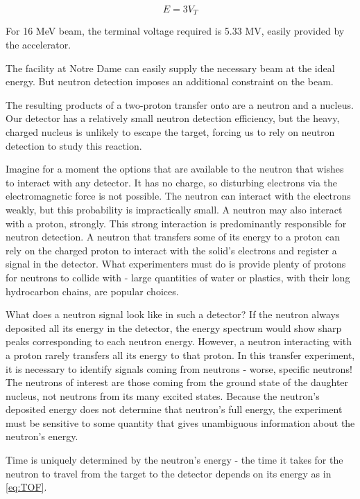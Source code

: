 \begin{equation}
E = 3V_T
\end{equation}

For 16 MeV  beam, the terminal voltage required is 5.33 MV, easily provided by the accelerator.

The facility at Notre Dame can easily supply the necessary beam at the ideal energy.  But neutron detection imposes an additional constraint on the beam.

The resulting products of a two-proton transfer onto  are a neutron and a  nucleus.  Our detector has a relatively small neutron detection efficiency, but the heavy, charged  nucleus is unlikely to escape the target, forcing us to rely on neutron detection to study this reaction.  

Imagine for a moment the options that are available to the neutron that wishes to interact with any detector.  It has no charge, so disturbing electrons via the electromagnetic force is not possible.  The neutron can interact with the electrons weakly, but this probability is impractically small.  A neutron may also interact with a proton, strongly.  This strong interaction is predominantly responsible for neutron detection.  A neutron that transfers some of its energy to a proton can rely on the charged proton to interact with the solid's electrons and register a signal in the detector.  What experimenters must do is provide plenty of protons for neutrons to collide with - large quantities of water or plastics, with their long hydrocarbon chains, are popular choices.

What does a neutron signal look like in such a detector?  If the neutron always deposited all its energy in the detector, the energy spectrum would show sharp peaks corresponding to each neutron energy.  However, a neutron interacting with a proton rarely transfers all its energy to that proton.  In this transfer experiment, it is necessary to identify signals coming from neutrons - worse, specific neutrons!  The neutrons of interest are those coming from the ground state of the daughter nucleus, not neutrons from its many excited states.  Because the neutron's deposited energy does not determine that neutron's full energy, the experiment must be sensitive to some quantity that gives unambiguous information about the neutron's energy.


Time is uniquely determined by the neutron's energy - the time it takes for the neutron to travel from the target to the detector depends on its energy as in \eq \ref{eq:TOF}.  

